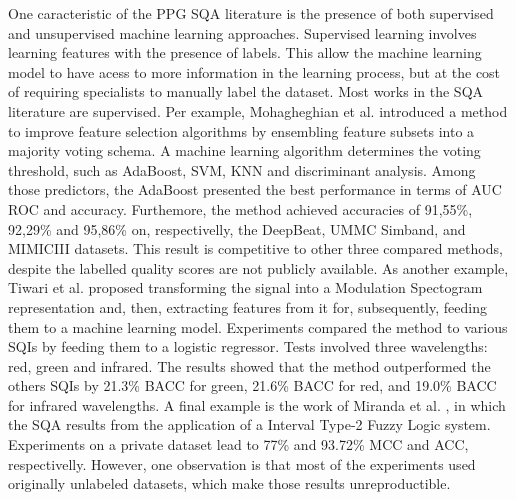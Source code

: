 One caracteristic of the \gls{PPG} \gls{SQA} literature is the presence of both supervised and unsupervised machine learning approaches. Supervised learning involves learning features with the presence of labels. This allow the machine learning model to have acess to more information in the learning process, but at the cost of requiring specialists to manually label the dataset. Most works in the \gls{SQA} literature are supervised. Per example, Mohagheghian et al. \cite{ppg-sqa-1} introduced a method to improve feature selection algorithms by ensembling feature subsets into a majority voting schema. A machine learning algorithm determines the voting threshold, such as AdaBoost, \gls{SVM}, \gls{KNN} and discriminant analysis. Among those predictors, the AdaBoost presented the best performance in terms of \gls{AUC} \gls{ROC} and accuracy. Furthemore, the method achieved accuracies of 91,55\%, 92,29\% and 95,86\% on, respectivelly, the DeepBeat, UMMC Simband, and MIMICIII datasets. This result is competitive to other three compared methods, despite the labelled quality scores are not publicly available. As another example, Tiwari et al. \cite{ppg-sqa-2} proposed transforming the signal into a Modulation Spectogram representation and, then, extracting features from it for, subsequently, feeding them to a machine learning model. Experiments compared the method to various \glspl{SQI} by feeding them to a logistic regressor. Tests involved three wavelengths: red, green and infrared. The results showed that the method outperformed the others \glspl{SQI} by 21.3\% \gls{BACC} for green, 21.6\% \gls{BACC} for red, and 19.0\% \gls{BACC} for infrared wavelengths. A final example is the work of Miranda et al. \cite{ppg-sqa-3}, in which the \gls{SQA} results from the application of a Interval Type-2 Fuzzy Logic system. Experiments on a private dataset lead to 77\% and 93.72\% \gls{MCC} and \gls{ACC}, respectivelly. However, one observation is that most of the experiments used originally unlabeled datasets, which make those results unreproductible. 
	
